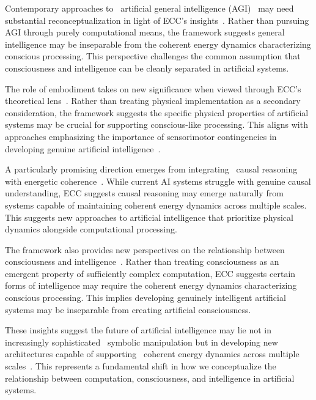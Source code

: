 Contemporary approaches to~ artificial general intelligence (AGI)~ may need substantial reconceptualization in light of ECC's insights~\cite{Goertzel2007, Adamatzky2020a}. Rather than pursuing AGI through purely computational means, the framework suggests general intelligence may be inseparable from the coherent energy dynamics characterizing conscious processing. This perspective challenges the common assumption that consciousness and intelligence can be cleanly separated in artificial systems.

The role of embodiment takes on new significance when viewed through ECC's theoretical lens~\cite{Thompson2007}. Rather than treating physical implementation as a secondary consideration, the framework suggests the specific physical properties of artificial systems may be crucial for supporting conscious-like processing. This aligns with approaches emphasizing the importance of sensorimotor contingencies in developing genuine artificial intelligence~\cite{ORegan2011, Clark2013}.

A particularly promising direction emerges from integrating~ causal reasoning with energetic coherence~\cite{Pearl2018, Haken2020}. While current AI systems struggle with genuine causal understanding, ECC suggests causal reasoning may emerge naturally from systems capable of maintaining coherent energy dynamics across multiple scales. This suggests new approaches to artificial intelligence that prioritize physical dynamics alongside computational processing.

The framework also provides new perspectives on the relationship between consciousness and intelligence~\cite{Searle2004, Metzinger2003}. Rather than treating consciousness as an emergent property of sufficiently complex computation, ECC suggests certain forms of intelligence may require the coherent energy dynamics characterizing conscious processing. This implies developing genuinely intelligent artificial systems may be inseparable from creating artificial consciousness.

These insights suggest the future of artificial intelligence may lie not in increasingly sophisticated~ symbolic manipulation but in developing new architectures capable of supporting~ coherent energy dynamics across multiple scales~\cite{Tegmark2017, Pribram2017}. This represents a fundamental shift in how we conceptualize the relationship between computation, consciousness, and intelligence in artificial systems.

